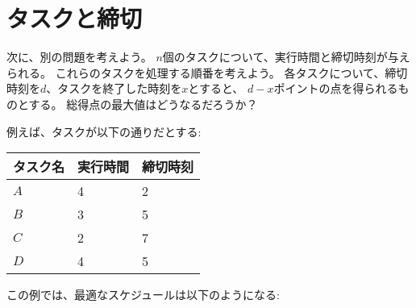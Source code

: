 \begin{comment}
\section{Tasks and deadlines}

Let us now consider a problem where
we are given $n$ tasks with durations and deadlines
and our task is to choose an order to perform the tasks.
For each task, we earn $d-x$ points
where $d$ is the task's deadline
and $x$ is the moment when we finish the task.
What is the largest possible total score
we can obtain?

For example, suppose that the tasks are as follows:
\begin{center}
\begin{tabular}{lll}
task & duration & deadline \\
\hline
$A$ & 4 & 2 \\
$B$ & 3 & 5 \\
$C$ & 2 & 7 \\
$D$ & 4 & 5 \\
\end{tabular}
\end{center}
In this case, an optimal schedule for the tasks
is as follows:
\end{comment}

\section{タスクと締切}

次に、別の問題を考えよう。
$n$個のタスクについて、実行時間と締切時刻が与えられる。
これらのタスクを処理する順番を考えよう。
各タスクについて、締切時刻を$d$、タスクを終了した時刻を$x$とすると、
$d-x$ポイントの点を得られるものとする。
総得点の最大値はどうなるだろうか？

例えば、タスクが以下の通りだとする:
\begin{center}
\begin{tabular}{lll}
タスク名 & 実行時間 & 締切時刻 \\
\hline
$A$ & 4 & 2 \\
$B$ & 3 & 5 \\
$C$ & 2 & 7 \\
$D$ & 4 & 5 \\
\end{tabular}
\end{center}

この例では、最適なスケジュールは以下のようになる:

